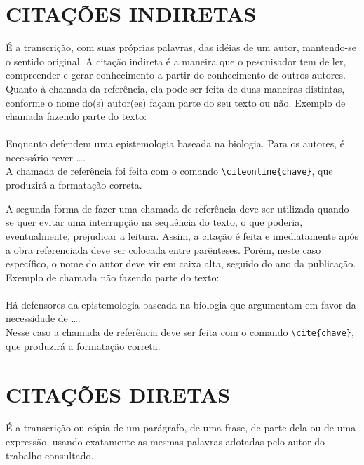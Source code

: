 \chapter{CITAÇÕES INDIRETAS}
\label{chap:citacoesLivres}

É a transcrição, com suas próprias palavras, das idéias de um autor, mantendo-se o sentido original. A citação indireta é a maneira que o pesquisador tem de ler, compreender e gerar conhecimento a partir do conhecimento de outros autores. Quanto à chamada da referência, ela pode ser feita de duas maneiras distintas, conforme o nome do(s) autor(es) façam parte do seu texto ou não. Exemplo de chamada fazendo parte do texto:\\
\\Enquanto {} defendem uma epistemologia baseada na biologia. Para os autores, é necessário rever \ldots.\\

A chamada de referência foi feita com o comando \verb|\citeonline{chave}|, que produzirá a formatação correta.

A segunda forma de fazer uma chamada de referência deve ser utilizada quando se quer evitar uma interrupção na sequência do texto, o que poderia, eventualmente, prejudicar a leitura. Assim, a citação é feita e imediatamente após a obra referenciada deve ser colocada entre parênteses. Porém, neste caso específico, o nome do autor deve vir em caixa alta, seguido do ano da publicação. Exemplo de chamada não fazendo parte do texto:\\
\\Há defensores da epistemologia baseada na biologia que argumentam em favor da necessidade de \ldots \cite{Maturana2003}.\\

Nesse caso a chamada de referência deve ser feita com o comando \verb|\cite{chave}|, que produzirá a formatação correta.

\chapter{CITAÇÕES DIRETAS}
\label{chap:citacoesLiterais}

É a transcrição ou cópia de um parágrafo, de uma frase, de parte dela ou de uma expressão, usando exatamente as mesmas palavras adotadas pelo autor do trabalho consultado.

